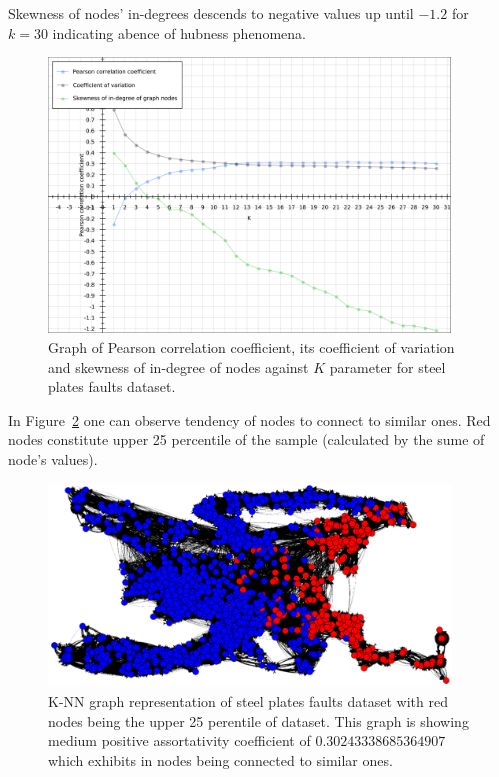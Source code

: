 Skewness of nodes' in-degrees descends to negative values up until $-1.2$ for $k = 30$ indicating abence of hubness phenomena.

\begin{figure}[h!]
  \centering
  \captionsetup{justification=centering}
    \includegraphics[width=0.95\textwidth]{images/faults_pearson.pdf}
  \caption{Graph of Pearson correlation coefficient, its coefficient of variation and skewness of in-degree of nodes against $K$ parameter for steel plates faults dataset.}
  \label{fig:graph_faults_pearson}
\end{figure}


In Figure~\ref{fig:graph_faults_nodes} one can observe tendency of nodes to connect to similar ones.
Red nodes constitute upper 25 percentile of the sample (calculated by the sume of node's values).

\begin{figure}[h!]
  \centering
  \captionsetup{justification=centering}
    \includegraphics[width=0.95\textwidth]{images/faults_graph.png}
  \caption{K-NN graph representation of steel plates faults dataset with red nodes being the upper 25 perentile of dataset. This graph is showing medium positive assortativity coefficient of $0.30243338685364907$ which exhibits in nodes being connected to similar ones.}
  \label{fig:graph_faults_nodes}
\end{figure}

